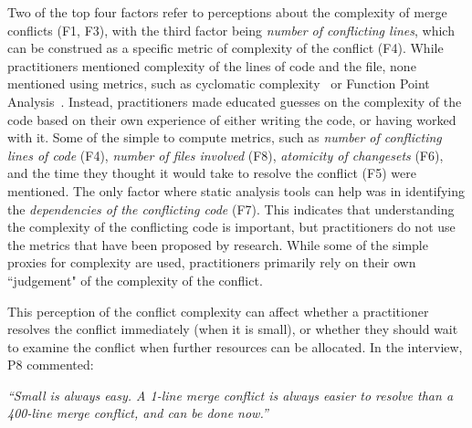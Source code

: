 \label{artifact-based-factors}
Two of the top four factors refer to perceptions about the complexity of merge conflicts (F1, F3), with the third factor being \textit{number of conflicting lines}, which can be construed as a specific metric of complexity of the conflict (F4). 
While practitioners mentioned complexity of the lines of code and the file, none mentioned using metrics, such as cyclomatic complexity~\cite{fenton2000quantitative}\cite{mccabe1976complexity} or Function Point Analysis~\cite{garmus2001fpa}\cite{symons1988function}. 
Instead, practitioners made educated guesses on the complexity of the code based on their own experience of either writing the code, or having worked with it. 
Some of the simple to compute metrics, such as \textit{number of conflicting lines of code} (F4), \textit{number of files involved} (F8), \textit{atomicity of changesets} (F6), and the time they thought it would take to resolve the conflict (F5) were mentioned. 
The only factor where static analysis tools can help was in identifying the \textit{dependencies of the conflicting code} (F7).
This indicates that understanding the complexity of the conflicting code is important, but practitioners do not use the metrics that have been proposed by research. While some of the simple proxies for complexity are used, practitioners primarily rely on their own ``judgement" of the complexity of the conflict.



This perception of the conflict complexity can affect whether a practitioner resolves the conflict immediately (when it is small), or whether they should wait to examine the conflict when further resources can be allocated.
In the interview, P8 commented:
\begin{displayquote}
\textit{``Small is always easy. A 1-line merge conflict is always easier to resolve than a 400-line merge conflict, and can be done now.''}
\end{displayquote}

